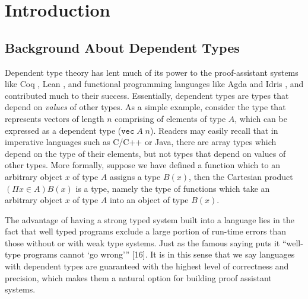 \chapter{Introduction}
\section{Background About Dependent Types}
Dependent type theory has lent much of its power to the proof-assistant systems like Coq \cite{huet1997coq}, Lean \cite{de2015lean}, and functional programming languages like Agda \cite{norell2008dependently} and Idris \cite{brady2013idris}, and contributed much to their success. Essentially, dependent types are types that depend on \emph{values} of other types. As a simple example, consider the type that represents vectors of length $n$ comprising of elements of type $A$, which can be expressed as a dependent type ($\texttt{vec}\; A\; n$). Readers may easily recall that in imperative languages such as C/C++ or Java, there are array types which depend on the type of their elements, but not types that depend on values of other types. More formally, suppose we have defined a function which to an arbitrary object $x$ of type $A$ assigns a type $B(x)$, then the Cartesian product $(\Pi x \in A)B(x)$ is a type, namely the type of functions which take an arbitrary object $x$ of type $A$ into an object of type $B(x)$.

The advantage of having a strong typed system built into a language lies in the fact that well typed programs exclude a large portion of run-time errors than those without or with weak type systems. Just as the famous saying puts it “well-type programs cannot ‘go wrong’” [16]. It is in this sense that we say languages with dependent types are guaranteed with the highest level of correctness and precision, which makes them a natural option for building proof assistant systems.

